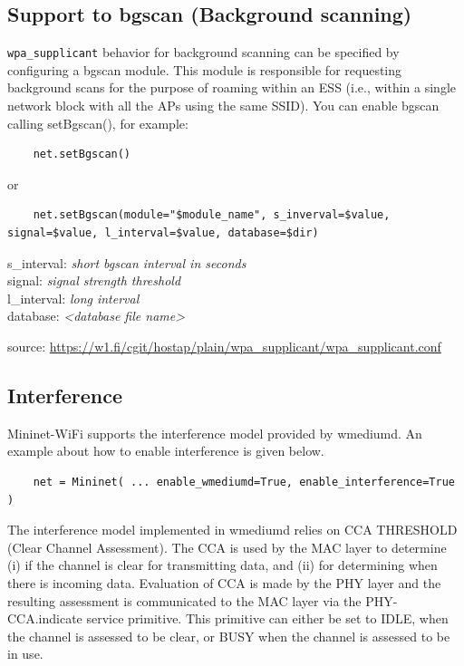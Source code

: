 \subsection{Support to bgscan (Background scanning)}

\texttt{wpa\_supplicant} behavior for background scanning can be specified by configuring a bgscan module. This module is responsible for requesting background scans for the purpose of roaming within an ESS (i.e., within a single network block with all the APs using the same SSID). You can enable bgscan calling setBgscan(), for example:

\begin{verbatim}
    net.setBgscan()
\end{verbatim}
or
\begin{verbatim}
    net.setBgscan(module="$module_name", s_inverval=$value, signal=$value, l_interval=$value, database=$dir)
\end{verbatim}


\noindent s\_interval: \textit{short bgscan interval in seconds} \\
signal: \textit{signal strength threshold} \\
l\_interval: \textit{long interval} \\
database: \textit{<database file name>}

\noindent source: \url{https://w1.fi/cgit/hostap/plain/wpa_supplicant/wpa_supplicant.conf}

\subsection{Interference}
Mininet-WiFi supports the interference model provided by wmediumd. An example about how to enable interference is given below.

\begin{verbatim}
    net = Mininet( ... enable_wmediumd=True, enable_interference=True )
\end{verbatim}

The interference model implemented in wmediumd relies on CCA THRESHOLD (Clear Channel Assessment). The CCA is used by the MAC layer to determine (i) if the channel is clear for transmitting data, and (ii) for determining when there is incoming data. Evaluation of CCA is made by the PHY layer and the resulting assessment is communicated to the MAC layer via the PHY-CCA.indicate service primitive. This primitive can either be set to IDLE, when the channel is assessed to be clear, or BUSY when the channel is assessed to be in use.

